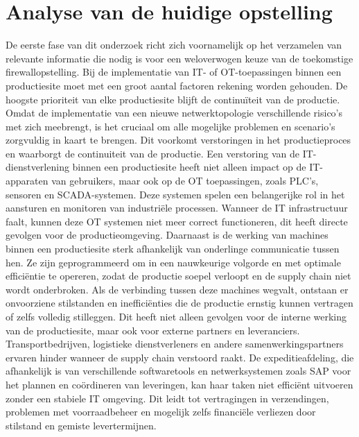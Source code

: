 \label{ch:onderzoek}

\section{Analyse van de huidige opstelling}

De eerste fase van dit onderzoek richt zich voornamelijk op het verzamelen van relevante informatie die nodig is voor een weloverwogen keuze van de toekomstige firewallopstelling. Bij de implementatie van IT- of OT-toepassingen binnen een productiesite moet met een groot aantal factoren rekening worden gehouden. De hoogste prioriteit van elke productiesite blijft de continuïteit van de productie. Omdat de implementatie van een nieuwe netwerktopologie verschillende risico’s met zich meebrengt, is het cruciaal om alle mogelijke problemen en scenario’s zorgvuldig in kaart te brengen. Dit voorkomt verstoringen in het productieproces en waarborgt de continuiteit van de productie.
Een verstoring van de IT-dienstverlening binnen een productiesite heeft niet alleen impact op de IT-apparaten van gebruikers, maar ook op de OT toepassingen, zoals PLC’s, sensoren en SCADA-systemen. Deze systemen spelen een belangerijke rol in het aansturen en monitoren van industriële processen. Wanneer de IT infrastructuur faalt, kunnen deze OT systemen niet meer correct functioneren, dit heeft directe gevolgen voor de productieomgeving. Daarnaast is de werking van machines binnen een productiesite sterk afhankelijk van onderlinge communicatie tussen hen. Ze zijn geprogrammeerd om in een nauwkeurige volgorde en met optimale efficiëntie te opereren, zodat de productie soepel verloopt en de supply chain niet wordt onderbroken. Als de verbinding tussen deze machines wegvalt, ontstaan er onvoorziene stilstanden en inefficiënties die de productie ernstig kunnen vertragen of zelfs volledig stilleggen. Dit heeft niet alleen gevolgen voor de interne werking van de productiesite, maar ook voor externe partners en leveranciers. Transportbedrijven, logistieke dienstverleners en andere samenwerkingspartners ervaren hinder wanneer de supply chain verstoord raakt. De expeditieafdeling, die afhankelijk is van verschillende softwaretools en netwerksystemen zoals SAP voor het plannen en coördineren van leveringen, kan haar taken niet efficiënt uitvoeren zonder een stabiele IT omgeving. Dit leidt tot vertragingen in verzendingen, problemen met voorraadbeheer en mogelijk zelfs financiële verliezen door stilstand en gemiste levertermijnen.


